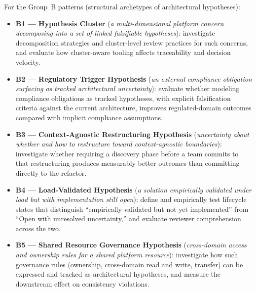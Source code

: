 For the Group~B patterns (structural archetypes of architectural hypotheses):

\begin{itemize}
  \item \textbf{B1 --- Hypothesis Cluster}
    (\emph{a multi-dimensional platform concern decomposing into a set of
    linked falsifiable hypotheses}): investigate decomposition strategies and
    cluster-level review practices for such concerns, and evaluate how
    cluster-aware tooling affects traceability and decision velocity.
  \item \textbf{B2 --- Regulatory Trigger Hypothesis}
    (\emph{an external compliance obligation surfacing as tracked
    architectural uncertainty}): evaluate whether modeling compliance
    obligations as tracked hypotheses, with explicit falsification criteria
    against the current architecture, improves regulated-domain outcomes
    compared with implicit compliance assumptions.
  \item \textbf{B3 --- Context-Agnostic Restructuring Hypothesis}
    (\emph{uncertainty about whether and how to restructure toward
    context-agnostic boundaries}): investigate whether requiring a discovery phase before a team
    commits to that restructuring produces measurably better outcomes than committing
    directly to the refactor.
  \item \textbf{B4 --- Load-Validated Hypothesis}
    (\emph{a solution empirically validated under load but with implementation
    still open}): define and empirically test lifecycle states that
    distinguish ``empirically validated but not yet implemented'' from
    ``Open with unresolved uncertainty,'' and evaluate reviewer comprehension
    across the two.
  \item \textbf{B5 --- Shared Resource Governance Hypothesis}
    (\emph{cross-domain access and ownership rules for a shared platform
    resource}): investigate how such governance rules (ownership,
    cross-domain read and write, transfer) can be expressed and tracked as
    architectural hypotheses, and measure the downstream effect on
    consistency violations.
\end{itemize}
